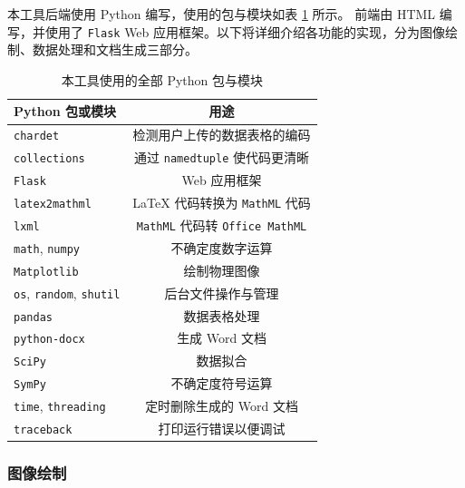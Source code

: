 本工具后端使用 Python 编写，使用的包与模块如表 \ref{tab:pkg} 所示。
前端由 HTML 编写，并使用了 \verb|Flask| Web 应用框架。以下将详细介绍各功能的实现，分为图像绘制、数据处理和文档生成三部分。

\begin{table}[htbp]
  \caption{本工具使用的全部 Python 包与模块}
  \label{tab:pkg}
  \vskip 0.1in
  \centering\small
  \begin{tabular}{lc}
  \toprule
  Python 包或模块 & 用途 \\
  \midrule
  \verb|chardet| & 检测用户上传的数据表格的编码 \\
  \verb|collections| & 通过 \verb|namedtuple| 使代码更清晰 \\
  \verb|Flask| & Web 应用框架 \\
  \verb|latex2mathml| & \LaTeX{} 代码转换为 \verb|MathML| 代码 \\
  \verb|lxml| & \verb|MathML| 代码转 \verb|Office MathML| \\
  \verb|math|, \verb|numpy| & 不确定度数字运算 \\
  \verb|Matplotlib| & 绘制物理图像 \\
  \verb|os|, \verb|random|, \verb|shutil| & 后台文件操作与管理 \\
  \verb|pandas| & 数据表格处理 \\
  \verb|python-docx| & 生成 Word 文档 \\
  \verb|SciPy| & 数据拟合 \\
  \verb|SymPy| & 不确定度符号运算 \\
  \verb|time|, \verb|threading| & 定时删除生成的 Word 文档 \\
  \verb|traceback| & 打印运行错误以便调试 \\
  \bottomrule
  \end{tabular}
  \vskip -0.1in
\end{table}

\subsubsection{图像绘制}

